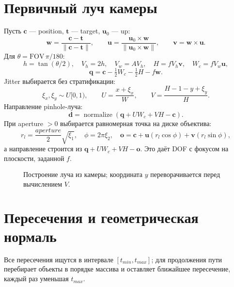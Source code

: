 \documentclass[11pt,a4paper]{article}
\newcommand{\code}[1]{\path{#1}}
\newcommand{\vect}[1]{\boldsymbol{#1}}
\begin{document}
\section{Первичный луч камеры}

Пусть $\vect c$ --- position, $\vect t$ --- target, $\vect u_0$ --- up:
\[
 \vect w=\frac{\vect c-\vect t}{\|\vect c-\vect t\|},\qquad
 \vect u=\frac{\vect u_0\times\vect w}{\|\vect u_0\times\vect w\|},\qquad
 \vect v=\vect w\times\vect u.
\]
Для $\theta=\mathrm{FOV}\,\pi/180$:
\[
 h=\tan(\theta/2),\quad V_h=2h,\quad V_w=A V_h,
 \quad H=fV_h\vect v,\quad W_c=fV_w\vect u,
\]
\[
 \vect q=\vect c-\tfrac12W_c-\tfrac12H-f\vect w.
\]
Jitter выбирается без стратификации:
\[
 \xi_x,\xi_y\sim U[0,1),\qquad
 U=\frac{x+\xi_x}{W},\qquad
 V=\frac{H-1-y+\xi_y}{H}.
\]
Направление pinhole-луча:
\[
 \vect d=\operatorname{normalize}(\vect q+U W_c+V H-\vect c).
\]
При aperture $>0$ выбирается равномерная точка на диске объектива:
\[
 r_l=\frac{aperture}{2}\sqrt{\xi_1},\quad
 \phi=2\pi\xi_2,\quad
 \vect o=\vect c+\vect u(r_l\cos\phi)+\vect v(r_l\sin\phi),
\]
а направление строится из $\vect q+UW_c+VH-\vect o$. Это даёт DOF с фокусом
на плоскости, заданной $f$.

\begin{figure}[ht]
\centering
{}
\caption{Построение луча из камеры; координата $y$ переворачивается перед вычислением $V$.}
\end{figure}

\section{Пересечения и геометрическая нормаль}

Все пересечения ищутся в интервале $[t_{min},t_{max}]$; для продолжения пути
\code{hitWorld} перебирает объекты в порядке массива и оставляет ближайшее
пересечение, каждый раз уменьшая $t_{max}$.
\end{document}
